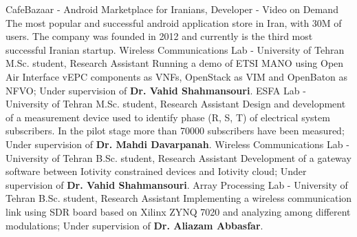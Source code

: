 {}
{CafeBazaar - Android Marketplace for Iranians,}
{Developer - Video on Demand}
{
  The most popular and successful android application store in Iran, with 30M of users. The company
was founded in 2012 and currently is the third most successful Iranian startup.
}
{}
{Wireless Communications Lab - University of Tehran}
{M.Sc. student, Research Assistant}
{
  Running a demo of ETSI MANO using Open Air Interface vEPC components as VNFs, OpenStack as VIM and OpenBaton as NFVO;
  Under supervision of \textbf{Dr. Vahid Shahmansouri}.
}
\medskip
{}
{}
{ESFA Lab - University of Tehran}
{M.Sc. student, Research Assistant}
{
  Design and development of a measurement device used to identify phase (R, S, T) of electrical system subscribers.
  In the pilot stage more than 70000 subscribers have been measured;
  Under supervision of \textbf{Dr. Mahdi Davarpanah}.
}
\medskip
{}
{}
{Wireless Communications Lab - University of Tehran}
{B.Sc. student, Research Assistant}
{
  Development of a gateway software between Iotivity constrained devices and Iotivity cloud;
  Under supervision of \textbf{Dr. Vahid Shahmansouri}.
}
\medskip
{}
{}
{Array Processing Lab - University of Tehran}
{B.Sc. student, Research Assistant}
{
  Implementing a wireless communication link using SDR board based on Xilinx ZYNQ 7020 and analyzing among different modulations;
  Under supervision of \textbf{Dr. Aliazam Abbasfar}.
}
\medskip
